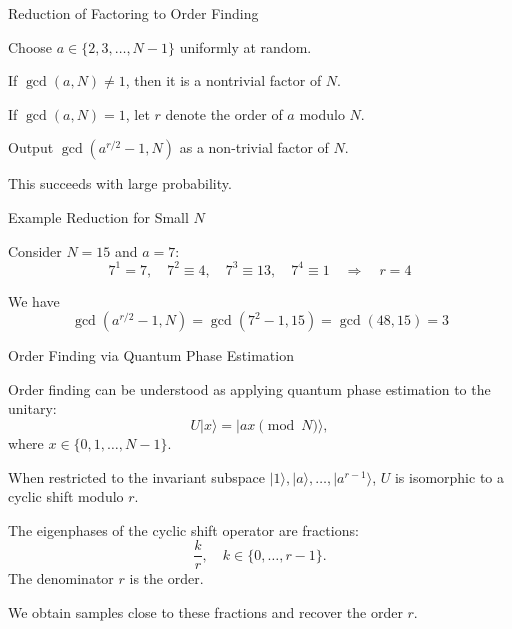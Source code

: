 \documentclass[handout]{beamer} %
\renewcommand{\>}{\rangle}
\newcommand{\<}{\langle}
\theoremstyle{definition}
\begin{document}

\begin{frame}{Reduction of Factoring to Order Finding}
  
Choose $a \in \{2,3,\ldots,N-1\}$ uniformly at random.

\bigskip

If $\gcd(a,N) \ne 1$, then it is a nontrivial factor of $N$.

\bigskip

If $\gcd(a,N)=1$, let $r$ denote the order of $a$ modulo $N$.

\bigskip
Output $\gcd(a^{r/2}-1,N)$ as a non-trivial factor of $N$.

\bigskip

\bigskip

This succeeds with large probability.

\end{frame}


\begin{frame}{Example Reduction for Small $N$}

\bigskip
Consider $N=15$ and $a=7$:
\[
7^1=7,\quad 
7^2 \equiv 4,\quad 
7^3 \equiv 13,\quad 
7^4 \equiv 1 \quad \Longrightarrow\quad r=4
\]

We have
\[
\gcd(a^{r/2}-1,N) = \gcd(7^2-1,15)=\gcd(48, 15)=3
\]

\end{frame}


\begin{frame}{Order Finding via Quantum Phase Estimation}

Order finding can be understood as applying quantum phase estimation to the unitary:
\[
U|x\> = |a x \pmod{N}\>,
\]
where $x \in \{0, 1, \ldots, N-1\}$.

\bigskip
When restricted to the invariant subspace $|1\>, |a\>, \ldots, |a^{r-1}\>$, $U$ is isomorphic to a cyclic shift modulo $r$.

\bigskip
The eigenphases of the cyclic shift operator are fractions:
\[
\frac{k}{r}, \quad k \in \{0, \ldots, r-1\}.
\]
The denominator $r$ is the order.

\bigskip
We obtain samples close to these fractions and recover the order $r$.
\end{frame}

\end{document}

